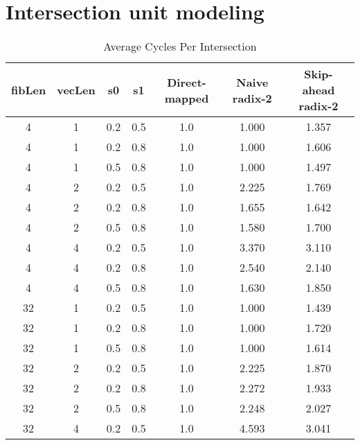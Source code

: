 \chapter{Intersection unit modeling}
\label{appendix:app_intersection_modeling}


\begin{table}
\centering
\caption{Average Cycles Per Intersection}
\begin{tabular}{|c|c|c|c|c|c|c|}
\toprule
 fibLen &  vecLen &  s0 &  s1 &  Direct-mapped &  Naive radix-2 &  Skip-ahead radix-2 \\
\midrule
      4 &       1 & 0.2 & 0.5 &            1.0 &          1.000 &               1.357 \\
      4 &       1 & 0.2 & 0.8 &            1.0 &          1.000 &               1.606 \\
      4 &       1 & 0.5 & 0.8 &            1.0 &          1.000 &               1.497 \\
      4 &       2 & 0.2 & 0.5 &            1.0 &          2.225 &               1.769 \\
      4 &       2 & 0.2 & 0.8 &            1.0 &          1.655 &               1.642 \\
      4 &       2 & 0.5 & 0.8 &            1.0 &          1.580 &               1.700 \\
      4 &       4 & 0.2 & 0.5 &            1.0 &          3.370 &               3.110 \\
      4 &       4 & 0.2 & 0.8 &            1.0 &          2.540 &               2.140 \\
      4 &       4 & 0.5 & 0.8 &            1.0 &          1.630 &               1.850 \\
     32 &       1 & 0.2 & 0.5 &            1.0 &          1.000 &               1.439 \\
     32 &       1 & 0.2 & 0.8 &            1.0 &          1.000 &               1.720 \\
     32 &       1 & 0.5 & 0.8 &            1.0 &          1.000 &               1.614 \\
     32 &       2 & 0.2 & 0.5 &            1.0 &          2.225 &               1.870 \\
     32 &       2 & 0.2 & 0.8 &            1.0 &          2.272 &               1.933 \\
     32 &       2 & 0.5 & 0.8 &            1.0 &          2.248 &               2.027 \\
     32 &       4 & 0.2 & 0.5 &            1.0 &          4.593 &               3.041 \\

\end{tabular}
\end{table}
